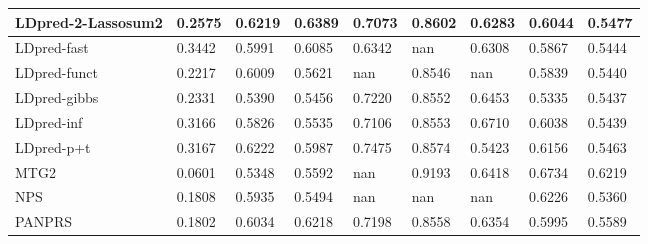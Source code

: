 \documentclass[pdflatex,sn-basic]{sn-jnl}
\begin{document}
\begin{table}[!ht]
{\begin{tabular}{|l|l|l|l|l|l|l|l|l|}
LDpred-2-Lassosum2 & \cellcolor[HTML]{C9DC81}0.2575 & \cellcolor[HTML]{7BC57D}0.6219 & \cellcolor[HTML]{92CC7E}0.6389 & \cellcolor[HTML]{FFEB84}0.7073 & \cellcolor[HTML]{FFEB84}0.8602 & \cellcolor[HTML]{C3DA81}0.6283 & \cellcolor[HTML]{FEEB84}0.6044 & \cellcolor[HTML]{F9EA84}0.5477 \\
\hline
LDpred-fast \cite{Reales_2021} & \cellcolor[HTML]{6DC17C}0.3442 & \cellcolor[HTML]{C2DA81}0.5991 & \cellcolor[HTML]{CBDC81}0.6085 & \cellcolor[HTML]{F8696B}0.6342 & nan & \cellcolor[HTML]{BDD881}0.6308 & \cellcolor[HTML]{FDCB7D}0.5867 & \cellcolor[HTML]{FFEB84}0.5444 \\
\hline
LDpred-funct \cite{M_rquez_Luna_2021} & \cellcolor[HTML]{F0E784}0.2217 & \cellcolor[HTML]{BCD881}0.6009 & \cellcolor[HTML]{FDCB7D}0.5621 & nan & \cellcolor[HTML]{FEE883}0.8546 & nan & \cellcolor[HTML]{FDC67C}0.5839 & \cellcolor[HTML]{FFEB84}0.5440 \\
\hline
LDpred-gibbs \cite{Reales_2021} & \cellcolor[HTML]{E3E383}0.2331 & \cellcolor[HTML]{FCB679}0.5390 & \cellcolor[HTML]{FBAE78}0.5456 & \cellcolor[HTML]{CDDD82}0.7220 & \cellcolor[HTML]{FEE983}0.8552 & \cellcolor[HTML]{9DCF7F}0.6453 & \cellcolor[HTML]{F8696B}0.5335 & \cellcolor[HTML]{FEE983}0.5437 \\
\hline
LDpred-inf \cite{Reales_2021} & \cellcolor[HTML]{8ACA7E}0.3166 & \cellcolor[HTML]{F5E984}0.5826 & \cellcolor[HTML]{FCBC7A}0.5535 & \cellcolor[HTML]{F4E884}0.7106 & \cellcolor[HTML]{FEE983}0.8553 & \cellcolor[HTML]{63BE7B}0.6710 & \cellcolor[HTML]{FFEB84}0.6038 & \cellcolor[HTML]{FEEA83}0.5439 \\
\hline
LDpred-p+t \cite{Reales_2021} & \cellcolor[HTML]{8ACA7E}0.3167 & \cellcolor[HTML]{7AC57D}0.6222 & \cellcolor[HTML]{DDE283}0.5987 & \cellcolor[HTML]{76C47D}0.7475 & \cellcolor[HTML]{FEEA83}0.8574 & \cellcolor[HTML]{F8696B}0.5423 & \cellcolor[HTML]{E7E483}0.6156 & \cellcolor[HTML]{FBEA84}0.5463 \\
\hline
MTG2 \cite{Lee_2016} & \cellcolor[HTML]{FA9272}0.0601 & \cellcolor[HTML]{FBB078}0.5348 & \cellcolor[HTML]{FDC67C}0.5592 & nan & \cellcolor[HTML]{7FC67D}0.9193 & \cellcolor[HTML]{A4D17F}0.6418 & \cellcolor[HTML]{6EC27C}0.6734 & \cellcolor[HTML]{71C27C}0.6219 \\
\hline
NPS \cite{Chun_2020} & \cellcolor[HTML]{FEDB80}0.1808 & \cellcolor[HTML]{D3DF82}0.5935 & \cellcolor[HTML]{FCB579}0.5494 & nan & nan & nan & \cellcolor[HTML]{D8E082}0.6226 & \cellcolor[HTML]{FCBB7A}0.5360 \\
\hline
PANPRS \cite{Chen_2020} & \cellcolor[HTML]{FEDA80}0.1802 & \cellcolor[HTML]{B5D680}0.6034 & \cellcolor[HTML]{B2D580}0.6218 & \cellcolor[HTML]{D5DF82}0.7198 & \cellcolor[HTML]{FEE983}0.8558 & \cellcolor[HTML]{B3D580}0.6354 & \cellcolor[HTML]{FEE382}0.5995 & \cellcolor[HTML]{E4E483}0.5589 \\

\end{tabular}}
\end{table}
\end{document}
